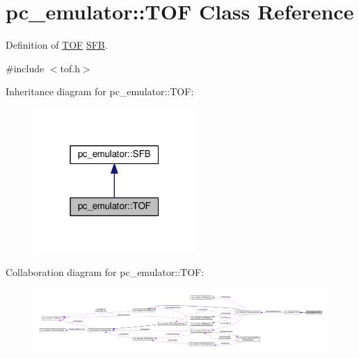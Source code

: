 \hypertarget{classpc__emulator_1_1TOF}{}\section{pc\+\_\+emulator\+:\+:T\+OF Class Reference}
\label{classpc__emulator_1_1TOF}


Definition of \hyperlink{classpc__emulator_1_1TOF}{T\+OF} \hyperlink{classpc__emulator_1_1SFB}{S\+FB}.  




{\ttfamily \#include $<$tof.\+h$>$}



Inheritance diagram for pc\+\_\+emulator\+:\+:T\+OF\+:
\nopagebreak
\begin{figure}[H]
\begin{center}
\leavevmode
\includegraphics[width=175pt]{classpc__emulator_1_1TOF__inherit__graph}
\end{center}
\end{figure}


Collaboration diagram for pc\+\_\+emulator\+:\+:T\+OF\+:
\nopagebreak
\begin{figure}[H]
\begin{center}
\leavevmode
\includegraphics[width=350pt]{classpc__emulator_1_1TOF__coll__graph}
\end{center}
\end{figure}
